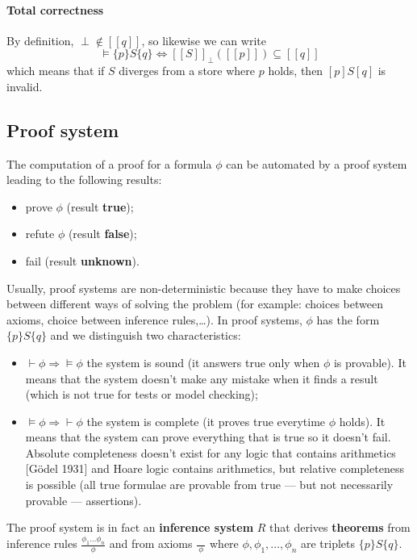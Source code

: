 \documentclass[12pt, a4paper]{book}
\begin{document}
\paragraph{Total correctness} By definition, $\perp \not\in [[q]]$, so likewise
we can write
$$
\vDash \{p\} S \{q\} \iff {[[S]]}_{\perp}([[p]]) \subseteq [[q]]
$$
which means that if $S$ diverges from a store where $p$ holds, then $[p] S [q]$
is invalid.

\subsection{Proof system}
\label{sub:Proof system}

The computation of a proof for a formula $\phi$ can be automated by a proof
system leading to the following results:

\begin{itemize}
    \item prove $\phi$ (result \textbf{true});
    \item refute $\phi$ (result \textbf{false});
    \item fail (result \textbf{unknown}).
\end{itemize}

Usually, proof systems are non-deterministic because they have to make choices
between different ways of solving the problem (for example: choices between
axioms, choice between inference rules,\ldots). In proof systems, $\phi$ has the
form $\{p\} S\{q\}$ and we distinguish two characteristics:
\begin{itemize}
    \item $\vdash \phi \Rightarrow \vDash \phi$ the system is sound (it answers
    true only when $\phi$ is provable). It means that the system doesn't make
    any mistake when it finds a result (which is not true for tests or model
    checking);
    \item $\vDash \phi \Rightarrow \vdash \phi$ the system is complete (it
    proves true everytime $\phi$ holds). It means that the system can prove
    everything that is true so it doesn't fail. Absolute completeness doesn't
    exist for any logic that contains arithmetics [Gödel 1931] and Hoare logic
    contains arithmetics, but relative completeness is possible (all true
    formulae are provable from true --- but not necessarily provable ---
    assertions).
\end{itemize}

The proof system is in fact an \textbf{inference system} $R$ that derives
\textbf{theorems} from inference rules $\frac{\phi_1\ldots\phi_n}{\phi}$ and
from axioms $\frac{}{\ \phi\ }$ where $\phi,\phi_1,\ldots,\phi_n$ are triplets
$\{p\}S\{q\}$. \newline
\end{document}
